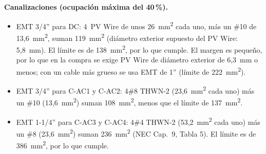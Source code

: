 \documentclass[12pt]{article}
\begin{document}
\textbf{Canalizaciones (ocupación máxima del 40\,\%).}
\begin{itemize}
\item EMT 3/4'' para DC: 4~PV Wire de unos 26~mm\textsuperscript{2} cada uno, más un \#10 de 13,6~mm\textsuperscript{2}, suman 119~mm\textsuperscript{2} (diámetro exterior supuesto del PV Wire: 5,8~mm). El límite es de 138~mm\textsuperscript{2}, por lo que cumple. El margen es pequeño, por lo que en la compra se exige PV Wire de diámetro exterior de 6,3~mm o menos; con un cable más grueso se usa EMT de 1'' (límite de 222~mm\textsuperscript{2}).
\item EMT 3/4'' para C-AC1 y C-AC2: 4\#8 THWN-2 (23,6~mm\textsuperscript{2} cada uno) más un \#10 (13,6~mm\textsuperscript{2}) suman 108~mm\textsuperscript{2}, menos que el límite de 137~mm\textsuperscript{2}.
\item EMT 1-1/4'' para C-AC3 y C-AC4: 4\#4 THWN-2 (53,2~mm\textsuperscript{2} cada uno) más un \#8 (23,6~mm\textsuperscript{2}) suman 236~mm\textsuperscript{2} (NEC Cap.~9, Tabla 5). El límite es de 386~mm\textsuperscript{2}, por lo que cumple.
\end{itemize}
\end{document}
